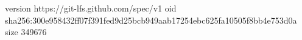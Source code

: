 version https://git-lfs.github.com/spec/v1
oid sha256:300e958432ff07f391fed9d25bcb949aab17254ebc625fa10505f8bb4e753d0a
size 349676
